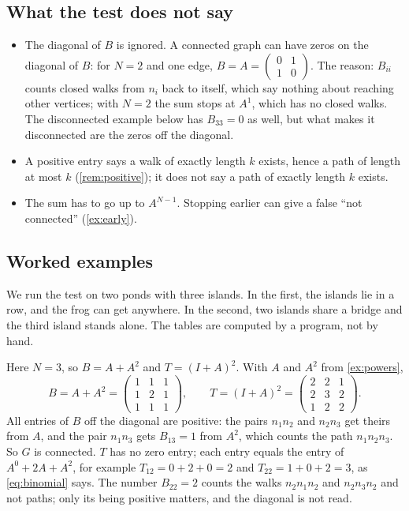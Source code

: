 \subsection{What the test does not say}\label{sec:limits}

\begin{itemize}
\item The diagonal of $B$ is ignored. A connected graph can have zeros on
  the diagonal of $B$: for $N=2$ and one edge, $B=A=\begin{pmatrix}0&1\\1&0\end{pmatrix}$.
  The reason: $B_{ii}$ counts closed walks from $n_i$ back to
  itself, which say nothing about reaching other vertices; with $N=2$ the
  sum stops at $A^1$, which has no closed walks. The disconnected example
  below has $B_{33}=0$ as well, but what makes it disconnected are the
  zeros off the diagonal.
\item A positive entry says a walk of exactly length $k$ exists, hence a
  path of length at most $k$ (\cref{rem:positive}); it does not say a path
  of exactly length $k$ exists.
\item The sum has to go up to $A^{N-1}$. Stopping earlier can give a false
  ``not connected'' (\cref{ex:early}).
\end{itemize}

\subsection{Worked examples}

\plainwords{} We run the test on two ponds with three islands. In the
first, the islands lie in a row, and the frog can get anywhere. In the
second, two islands share a bridge and the third island stands alone. The
tables are computed by a program, not by hand.

\begin{example}\label{ex:connected}
Here $N=3$, so $B=A+A^2$ and $T=(I+A)^2$. With $A$ and $A^2$ from
\cref{ex:powers},
\[
B=A+A^2=\begin{pmatrix}1&1&1\\1&2&1\\1&1&1\end{pmatrix},\qquad
T=(I+A)^2=\begin{pmatrix}2&2&1\\2&3&2\\1&2&2\end{pmatrix}.
\]
All entries of $B$ off the diagonal are positive: the pairs $n_1n_2$ and
$n_2n_3$ get theirs from $A$, and the pair $n_1n_3$ gets $B_{13}=1$ from
$A^2$, which counts the path $n_1n_2n_3$. So $G$ is connected. $T$ has no
zero entry; each entry equals the entry of $A^0+2A+A^2$, for example
$T_{12}=0+2+0=2$ and $T_{22}=1+0+2=3$, as \cref{eq:binomial} says. The
number $B_{22}=2$ counts the walks $n_2n_1n_2$ and $n_2n_3n_2$ and not
paths; only its being positive matters, and the diagonal is not read.
\end{example}

